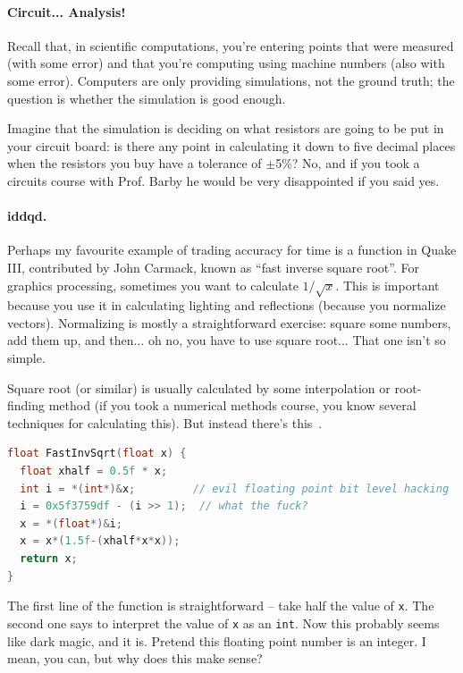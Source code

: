 \paragraph{Circuit... Analysis!} Recall that, in scientific computations, you're entering points that were measured (with some error) and that you're computing using machine numbers (also with some error). Computers are only providing simulations, not the ground truth; the question is whether the simulation is good enough.

Imagine that the simulation is deciding on what resistors are going to be put in your circuit board: is there any point in calculating it down to five decimal places when the resistors you buy have a tolerance of $\pm$5\%? No, and if you took a circuits course with Prof. Barby he would be very disappointed if you said yes.


\paragraph{iddqd.} Perhaps my favourite example of trading accuracy for time is a function in Quake III, contributed by John Carmack, known as ``fast inverse square root''. For graphics processing, sometimes you want to calculate $1/\sqrt{x}$. This is important because you use it in calculating lighting and reflections (because you normalize vectors). Normalizing is mostly a straightforward exercise: square some numbers, add them up, and then... oh no, you have to use square root... That one isn't so simple.

Square root (or similar) is usually calculated by some interpolation or root-finding method (if you took a numerical methods course, you know several techniques for calculating this). But instead there's this~\cite{fisqrt}. 

\begin{lstlisting}[language=C]
float FastInvSqrt(float x) {
  float xhalf = 0.5f * x;
  int i = *(int*)&x;         // evil floating point bit level hacking
  i = 0x5f3759df - (i >> 1);  // what the fuck?
  x = *(float*)&i;
  x = x*(1.5f-(xhalf*x*x));
  return x;
}
\end{lstlisting}

The first line of the function is straightforward -- take half the value of \texttt{x}. The second one says to interpret the value of \texttt{x} as an \texttt{int}. Now this probably seems like dark magic, and it is. Pretend this floating point number is an integer. I mean, you can, but why does this make sense? 

